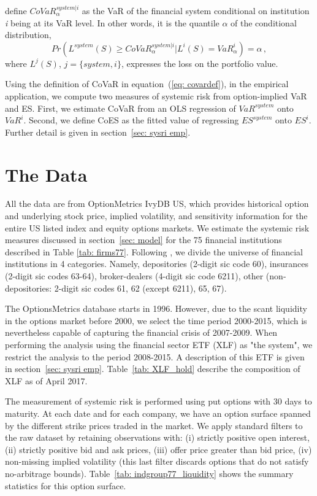 \documentclass[11pt,a4paper,english]{article}
\begin{document}
\citet{Adrian2016} define $CoVaR_{\alpha}^{system|i}$ as the VaR of the financial system conditional on institution \textit{i} being at its VaR level. In other words, it is the quantile $\alpha$ of the conditional distribution,
\begin{equation}
\label{eq: covardef}
Pr(L^{system}(S)\geq CoVaR_{\alpha}^{system|i}|L^i(S)=VaR^i_{\alpha})=\alpha \, ,
\end{equation}
where $L^j(S)$, $j=\{system, i\}$, expresses the loss on the portfolio value.

Using the definition of CoVaR in equation~(\ref{eq: covardef}), in the empirical application, we compute two measures of systemic risk from option-implied VaR and ES. First, we estimate CoVaR from an OLS regression of $VaR^{system}$ onto $VaR^i$. Second, we define CoES as the fitted value of regressing $ES^{system}$ onto $ES^{i}$. Further detail is given in section~\ref{sec: sysri emp}.
\section{The Data}
\label{sec: data}
All the data are from OptionMetrics IvyDB US, which provides historical option and underlying stock price, implied volatility, and sensitivity information for the entire US listed index and equity options markets. We estimate the systemic risk measures discussed in section~\ref{sec: model} for the 75 financial institutions described in Table \ref{tab: firms77}. Following \citet{Acharya2017}, we divide the universe of financial institutions in 4 categories. Namely, depositories (2-digit sic code 60), insurances (2-digit sic codes 63-64), broker-dealers (4-digit sic code 6211), other (non-depositories: 2-digit sic codes 61, 62 (except 6211), 65, 67). 

The OptionsMetrics database starts in 1996. However, due to the scant liquidity in the options market before 2000, we select the time period 2000-2015, which is nevertheless capable of capturing the financial crisis of 2007-2009. When performing the analysis using the financial sector ETF (XLF) as "the system", we restrict the analysis to the period 2008-2015. A description of this ETF is given in section~\ref{sec: sysri emp}. Table~\ref{tab: XLF_hold} describe the composition of XLF as of April 2017. 

The measurement of systemic risk is performed using put options with 30 days to maturity. At each date and for each company, we have an option surface spanned by the different strike prices traded in the market. We apply standard filters to the raw dataset by retaining observations with: (i) strictly positive open interest, (ii) strictly positive bid and ask prices, (iii) offer price greater than bid price, (iv) non-missing implied volatility (this last filter discards options that do not satisfy no-arbitrage bounds).   Table~\ref{tab: indgroup77_liquidity} shows the summary statistics for this option surface. 
\end{document}
